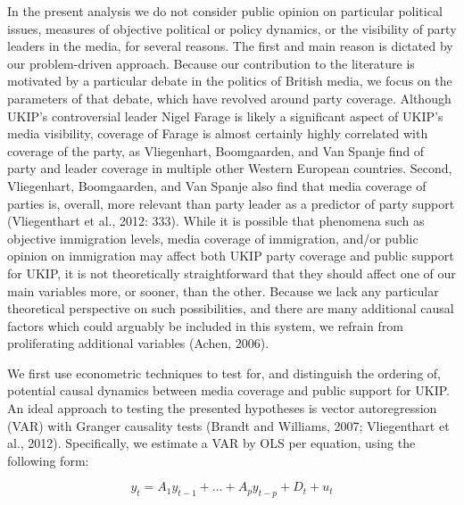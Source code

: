 \documentclass[12pt,article]{article}
\begin{document}
In the present analysis we do not consider public opinion on particular
political issues, measures of objective political or policy dynamics, or
the visibility of party leaders in the media, for several reasons. The
first and main reason is dictated by our problem-driven approach.
Because our contribution to the literature is motivated by a particular
debate in the politics of British media, we focus on the parameters of
that debate, which have revolved around party coverage. Although UKIP's
controversial leader Nigel Farage is likely a significant aspect of
UKIP's media visibility, coverage of Farage is almost certainly highly
correlated with coverage of the party, as Vliegenhart, Boomgaarden, and
Van Spanje find of party and leader coverage in multiple other Western
European countries. Second, Vliegenhart, Boomgaarden, and Van Spanje
also find that media coverage of parties is, overall, more relevant than
party leader as a predictor of party support (Vliegenthart et al., 2012:
333). While it is possible that phenomena such as objective immigration
levels, media coverage of immigration, and/or public opinion on
immigration may affect both UKIP party coverage and public support for
UKIP, it is not theoretically straightforward that they should affect
one of our main variables more, or sooner, than the other. Because we
lack any particular theoretical perspective on such possibilities, and
there are many additional causal factors which could arguably be
included in this system, we refrain from proliferating additional
variables (Achen, 2006).

We first use econometric techniques to test for, and distinguish the
ordering of, potential causal dynamics between media coverage and public
support for UKIP. An ideal approach to testing the presented hypotheses
is vector autoregression (VAR) with Granger causality tests (Brandt and
Williams, 2007; Vliegenthart et al., 2012). Specifically, we estimate a
VAR by OLS per equation, using the following form:

\begin{equation}
 \label{eq:VAR}
    y_t = A_1 y_{t-1} + … + A_p y_{t-p} + D_t + u_t
\end{equation}
\end{document}
